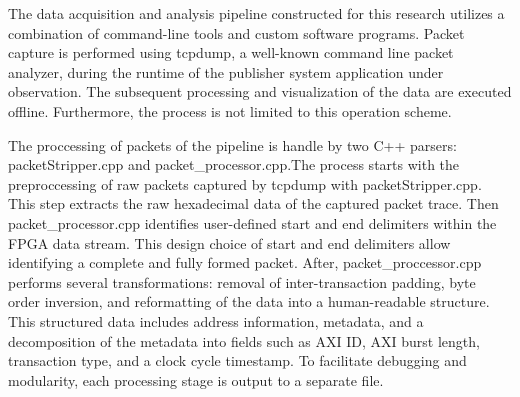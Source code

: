 

The data acquisition and analysis pipeline constructed for this research utilizes a combination of command-line tools and custom software programs. Packet capture is performed using tcpdump, a well-known command line packet analyzer, during the runtime of the publisher system application under observation. The subsequent processing and visualization of the data are executed offline. Furthermore, the process is not limited to this operation scheme.

The proccessing of packets of the pipeline is handle by two C++ parsers: packetStripper.cpp and packet\_processor.cpp.The process starts with the preproccessing of raw packets captured by tcpdump  with packetStripper.cpp. This step extracts the raw hexadecimal data of the captured packet trace. Then packet\_processor.cpp identifies user-defined start and end delimiters within the FPGA data stream. This design choice of start and end delimiters allow identifying a complete and fully formed packet. After, packet\_proccessor.cpp performs several transformations: removal of inter-transaction padding, byte order inversion, and reformatting of the data into a human-readable structure. This structured data includes address information, metadata, and a decomposition of the metadata into fields such as AXI ID, AXI burst length, transaction type, and a clock cycle timestamp. To facilitate debugging and modularity, each processing stage is output to a separate file.

